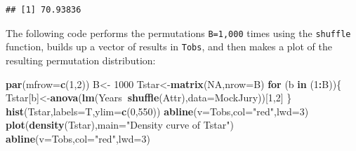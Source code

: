 \documentclass[]{book}
\newenvironment{Shaded}{\begin{snugshade}}{\end{snugshade}}
\newcommand{\KeywordTok}[1]{\textcolor[rgb]{0.13,0.29,0.53}{\textbf{#1}}}
\newcommand{\DataTypeTok}[1]{\textcolor[rgb]{0.13,0.29,0.53}{#1}}
\newcommand{\DecValTok}[1]{\textcolor[rgb]{0.00,0.00,0.81}{#1}}
\newcommand{\StringTok}[1]{\textcolor[rgb]{0.31,0.60,0.02}{#1}}
\newcommand{\OtherTok}[1]{\textcolor[rgb]{0.56,0.35,0.01}{#1}}
\newcommand{\ControlFlowTok}[1]{\textcolor[rgb]{0.13,0.29,0.53}{\textbf{#1}}}
\newcommand{\OperatorTok}[1]{\textcolor[rgb]{0.81,0.36,0.00}{\textbf{#1}}}
\newcommand{\NormalTok}[1]{#1}
\theoremstyle{definition}
\theoremstyle{definition}
\theoremstyle{remark}
\begin{document}
\begin{verbatim}
## [1] 70.93836
\end{verbatim}

The following code performs the permutations \texttt{B=1,000} times
using the \texttt{shuffle} function, builds up a vector of results in
\texttt{Tobs}, and then makes a plot of the resulting permutation
distribution:







\begin{Shaded}
\begin{Highlighting}[]
\KeywordTok{par}\NormalTok{(}\DataTypeTok{mfrow=}\KeywordTok{c}\NormalTok{(}\DecValTok{1}\NormalTok{,}\DecValTok{2}\NormalTok{))}
\NormalTok{B<-}\StringTok{ }\DecValTok{1000}
\NormalTok{Tstar<-}\KeywordTok{matrix}\NormalTok{(}\OtherTok{NA}\NormalTok{,}\DataTypeTok{nrow=}\NormalTok{B)}
\ControlFlowTok{for}\NormalTok{ (b }\ControlFlowTok{in}\NormalTok{ (}\DecValTok{1}\OperatorTok{:}\NormalTok{B))\{}
\NormalTok{  Tstar[b]<-}\KeywordTok{anova}\NormalTok{(}\KeywordTok{lm}\NormalTok{(Years}\OperatorTok{~}\KeywordTok{shuffle}\NormalTok{(Attr),}\DataTypeTok{data=}\NormalTok{MockJury))[}\DecValTok{1}\NormalTok{,}\DecValTok{2}\NormalTok{]}
\NormalTok{  \}}
\KeywordTok{hist}\NormalTok{(Tstar,}\DataTypeTok{labels=}\NormalTok{T,}\DataTypeTok{ylim=}\KeywordTok{c}\NormalTok{(}\DecValTok{0}\NormalTok{,}\DecValTok{550}\NormalTok{))}
\KeywordTok{abline}\NormalTok{(}\DataTypeTok{v=}\NormalTok{Tobs,}\DataTypeTok{col=}\StringTok{"red"}\NormalTok{,}\DataTypeTok{lwd=}\DecValTok{3}\NormalTok{)}
\KeywordTok{plot}\NormalTok{(}\KeywordTok{density}\NormalTok{(Tstar),}\DataTypeTok{main=}\StringTok{"Density curve of Tstar"}\NormalTok{)}
\KeywordTok{abline}\NormalTok{(}\DataTypeTok{v=}\NormalTok{Tobs,}\DataTypeTok{col=}\StringTok{"red"}\NormalTok{,}\DataTypeTok{lwd=}\DecValTok{3}\NormalTok{)}
\end{Highlighting}
\end{Shaded}
\end{document}
